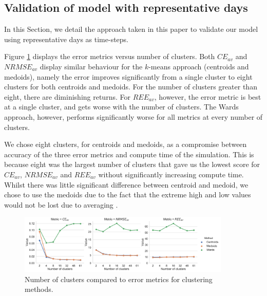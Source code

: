 \subsection{Validation of model with representative days}
\label{elecsim:ssec:representative_validation}

In this Section, we detail the approach taken in this paper to validate our model using representative days as time-steps. 


Figure \ref{fig:error_metrics_vs_cluster_number} displays the error metrics versus number of clusters. Both $CE_{av}$ and $NRMSE_{av}$ display similar behaviour for the $k$-means approach (centroids and medoids), namely the error improves significantly from a single cluster to eight clusters for both centroids and medoids. For the number of clusters greater than eight, there are diminishing returns. For $REE_{av}$, however, the error metric is best at a single cluster, and gets worse with the number of clusters. The Wards approach, however, performs significantly worse for all metrics at every number of clusters. 



We chose eight clusters, for centroids and medoids, as a compromise between accuracy of the three error metrics and compute time of the simulation. This is because eight was the largest number of clusters that gave us the lowest score for $CE_{av}$, $NRMSE_{av}$ and $REE_{av}$ without significantly increasing compute time. Whilst there was little significant difference between centroid and medoid, we chose to use the medoids due to the fact that the extreme high and low values would not be lost due to averaging \cite{Hilbers2019}.





\begin{figure}
	\centering
	\includegraphics[width=0.9\textwidth]{Chapter4/figures/clusters_compared_wards.pdf}
	\caption{Number of clusters compared to error metrics for clustering methods.}
	\label{fig:error_metrics_vs_cluster_number}
\end{figure}









